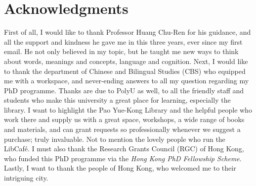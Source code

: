 \chapter*{Acknowledgments}
\label{ch:acknowledgments}


First of all, I would like to thank Professor Huang Chu-Ren for his guidance, and all the support and kindness he gave me in this three years, ever since my first email. He not only believed in my topic, but he taught me new ways to think about words, meanings and concepts, language and cognition. Next, I would like to thank the department of Chinese and Bilingual Studies (CBS) who equipped me with a workspace, and never-ending answers to all my question regarding my PhD programme. Thanks are due to PolyU as well, to all the friendly staff and students who make this university a great place for learning, especially the library. I want to highlight the Pao Yue-Kong Library and the helpful people who work there and supply us with a great space, workshops, a wide range of books and materials, and can grant requests so professionally whenever we suggest a purchase; truly invaluable. Not to mention the lovely people who run the LibCafé. I must also thank the Research Grants Council (RGC) of Hong Kong, who funded this PhD programme via the \textit{Hong Kong PhD Fellowship Scheme}. Lastly, I want to thank the people of Hong Kong, who welcomed me to their intriguing city.




